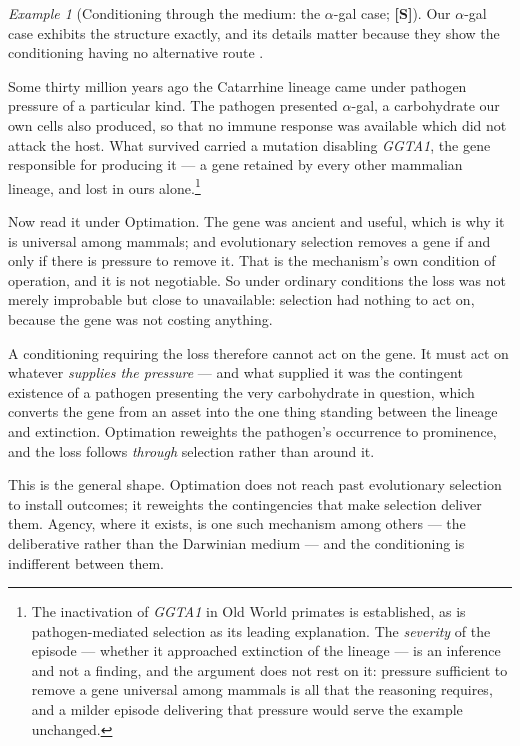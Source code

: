 \documentclass[11pt]{article}
\numberwithin{equation}{section}
\theoremstyle{plain}
\theoremstyle{definition}
\theoremstyle{remark}
\newtheorem{example}[theorem]{Example}
\begin{document}
\begin{example}[Conditioning through the medium: the
$\alpha$-gal case; \textbf{[S]}]\label{gc:ex:medium}
Our $\alpha$-gal case exhibits the structure exactly, and its
details matter because they show the conditioning having no alternative
route \cite{Nexus}.

Some thirty million years ago the Catarrhine lineage came under
pathogen pressure of a particular kind. The pathogen presented
$\alpha$-gal, a carbohydrate our own cells also produced, so that no
immune response was available which did not attack the host. What
survived carried a mutation disabling \textit{GGTA1}, the gene
responsible for producing it --- a gene retained by every other
mammalian lineage, and lost in ours alone.\footnote{The inactivation of
\textit{GGTA1} in Old World primates is established, as is
pathogen-mediated selection as its leading explanation. The
\emph{severity} of the episode --- whether it approached extinction of
the lineage --- is an inference and not a finding, and the argument does
not rest on it: pressure sufficient to remove a gene universal among
mammals is all that the reasoning requires, and a milder episode
delivering that pressure would serve the example unchanged.}

Now read it under Optimation. The gene was ancient and useful, which is
why it is universal among mammals; and evolutionary selection removes a
gene if and only if there is pressure to remove it. That is the
mechanism's own condition of operation, and it is not negotiable. So
under ordinary conditions the loss was not merely improbable but close
to unavailable: selection had nothing to act on, because the gene was
not costing anything.

A conditioning requiring the loss therefore cannot act on the gene. It
must act on whatever \emph{supplies the pressure} --- and what supplied
it was the contingent existence of a pathogen presenting the very
carbohydrate in question, which converts the gene from an asset into the
one thing standing between the lineage and extinction. Optimation
reweights the pathogen's occurrence to prominence, and the loss follows
\emph{through} selection rather than around it.

This is the general shape. Optimation does not reach past evolutionary
selection to install outcomes; it reweights the contingencies that make
selection deliver them. Agency, where it exists, is one such mechanism
among others --- the deliberative rather than the Darwinian medium ---
and the conditioning is indifferent between them.
\end{example}
\end{document}
